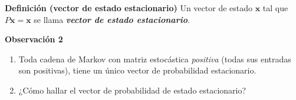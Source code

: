 {\begin{frame}
	\vspace{-1mm}
	\begin{defi}{\textbf{Definición (vector de estado estacionario)}}\justifying
		Un vector de  estado $\mathbf{x}$ tal que $P \mathbf{x} = \mathbf{x}$ se llama 
		\textbf{\textit{vector de estado estacionario}}.
	\end{defi}
	
	\vspace{-1mm}
	\begin{alertblock}{\textbf{Observación 2}}
		\begin{enumerate}[$a$]\justifying 
			\item Toda cadena de Markov con matriz estocástica \textit{positiva} (todas sus entradas son positivas), 
			tiene un único vector de probabilidad estacionario.
			\item ¿Cómo hallar el vector de probabilidad de estado estacionario?
		\end{enumerate}
	\end{alertblock}	
	
\end{frame}
}


\subsection{}

